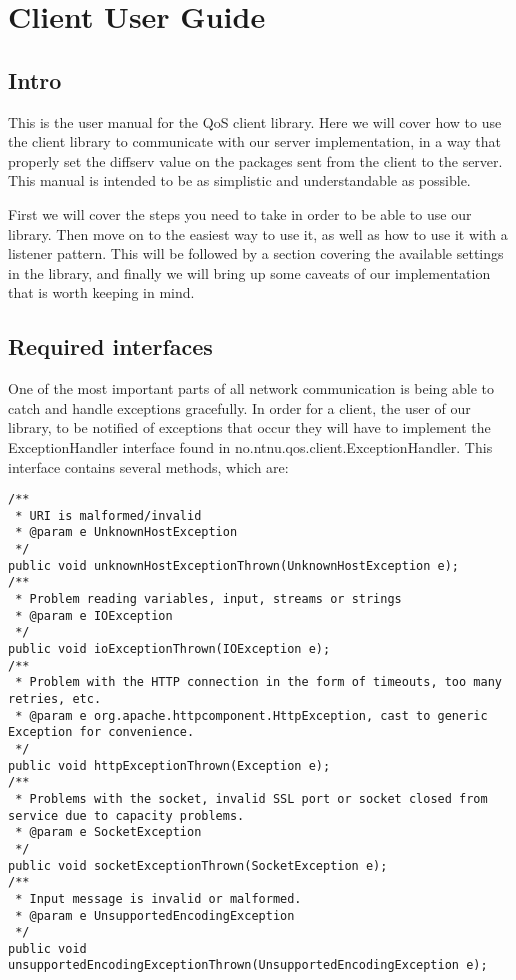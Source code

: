 \section{Client User Guide}\label{Client User Guide} 
    
    \subsection{Intro}\label{userguideIntro}
    
    This is the user manual for the QoS client library. Here we will cover how to use the client library to communicate with our server implementation, in a way that properly set the diffserv value on the packages sent from the client to the server. This manual is intended to be as simplistic and understandable as possible.

    First we will cover the steps you need to take in order to be able to use our library. Then move on to the easiest way to use it, as well as how to use it with a listener pattern. This will be followed by a section covering the available settings in the library, and finally we will bring up some caveats of our implementation that is worth keeping in mind.

    \subsection{Required interfaces}\label{userguideReqiredInterfaces}
    
    One of the most important parts of all network communication is being able to catch and handle exceptions gracefully. In order for a client, the user of our library, to be notified of exceptions that occur they will have to implement the ExceptionHandler interface found in no.ntnu.qos.client.ExceptionHandler. This interface contains several methods, which are:

\lstset{language=java}
\lstset{frame=single}
\lstset{breaklines=true}
\begin{lstlisting}[caption={ExceptionHandler interface}, label=userguideExceptionHandler]
/**
 * URI is malformed/invalid
 * @param e UnknownHostException
 */
public void unknownHostExceptionThrown(UnknownHostException e);
/**
 * Problem reading variables, input, streams or strings
 * @param e IOException
 */
public void ioExceptionThrown(IOException e);
/**
 * Problem with the HTTP connection in the form of timeouts, too many retries, etc.
 * @param e org.apache.httpcomponent.HttpException, cast to generic Exception for convenience.
 */
public void httpExceptionThrown(Exception e);
/**
 * Problems with the socket, invalid SSL port or socket closed from service due to capacity problems.
 * @param e SocketException
 */
public void socketExceptionThrown(SocketException e);
/**
 * Input message is invalid or malformed.
 * @param e UnsupportedEncodingException
 */
public void unsupportedEncodingExceptionThrown(UnsupportedEncodingException e);
\end{lstlisting}

